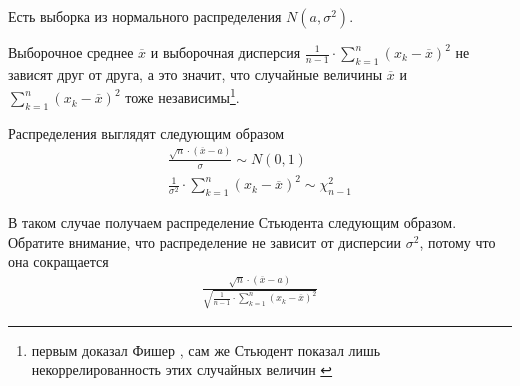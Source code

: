 \begin{example}
  Есть выборка \xsample из нормального распределения
  $N\left( a, \sigma^2 \right)$.

  Выборочное среднее $\overline{x}$ и выборочная дисперсия
  $\frac{1}{n-1} \cdot \sum_{k=1}^{n} \left( x_k - \overline{x} \right)^2$
  не зависят друг от друга, а это значит, что случайные величины
  $\overline{x}$ и $\sum_{k=1}^{n} \left( x_k - \overline{x} \right)^2$ тоже
  независимы\footnote{первым доказал Фишер \cite{FisherStudentApplication},
  сам же Стьюдент показал лишь некоррелированность этих случайных величин
  \cite{StudentProbableError}}.

  Распределения выглядят следующим образом
  \begin{align*}
      \frac{\sqrt{n} \cdot \left( \overline{x} - a \right)}{\sigma}
      \sim N\left( 0, 1 \right) \\
      \frac{1}{\sigma^2}
          \cdot \sum_{k=1}^{n}\left( x_k - \overline{x} \right)^2
          \sim \chi_{n-1}^2
  \end{align*}

  В таком случае получаем распределение Стьюдента следующим образом. Обратите
  внимание, что распределение не зависит от дисперсии $\sigma^2$, потому что
  она сокращается
  \begin{align*}
      \frac{\sqrt{n} \cdot \left( \overline{x} - a \right)}{
      \sqrt{\frac{1}{n-1}
          \cdot \sum_{k=1}^{n}\left( x_k - \overline{x} \right)^2}}
  \end{align*}
\end{example}
